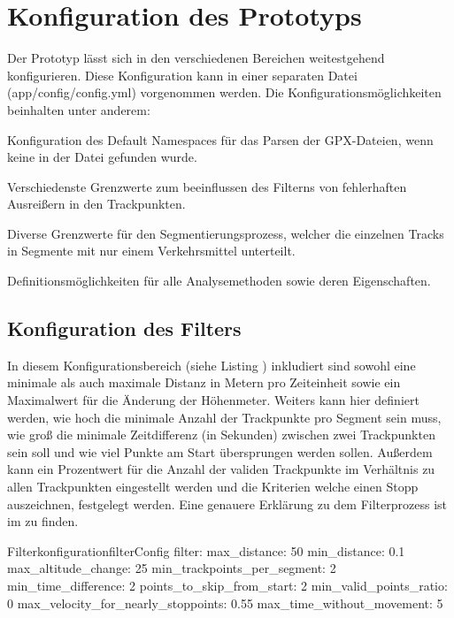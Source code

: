 
\section{Konfiguration des Prototyps}
Der Prototyp lässt sich in den verschiedenen Bereichen weitestgehend konfigurieren. Diese Konfiguration kann in einer separaten Datei (app/config/config.yml) vorgenommen werden. Die Konfigurationsmöglichkeiten beinhalten unter anderem:
\begin{pitemize}
\item Konfiguration des Default Namespaces für das Parsen der GPX-Dateien, wenn keine in der Datei gefunden wurde.
\item Verschiedenste Grenzwerte zum beeinflussen des Filterns von fehlerhaften Ausreißern in den Trackpunkten.
\item Diverse Grenzwerte für den Segmentierungsprozess, welcher die einzelnen Tracks in Segmente mit nur einem Verkehrsmittel unterteilt.
\item Definitionsmöglichkeiten für alle Analysemethoden sowie deren Eigenschaften.
\end{pitemize}

\subsection{Konfiguration des Filters}
In diesem Konfigurationsbereich (siehe Listing ) inkludiert sind sowohl eine minimale als auch maximale Distanz in Metern pro Zeiteinheit sowie ein Maximalwert für die Änderung der Höhenmeter. Weiters kann hier definiert werden, wie hoch die minimale Anzahl der Trackpunkte pro Segment sein muss, wie groß die minimale Zeitdifferenz (in Sekunden) zwischen zwei Trackpunkten sein soll und wie viel Punkte am Start übersprungen werden sollen. Außerdem kann ein Prozentwert für die Anzahl der validen Trackpunkte im Verhältnis zu allen Trackpunkten eingestellt werden und die Kriterien welche einen Stopp auszeichnen, festgelegt werden. Eine genauere Erklärung zu dem Filterprozess ist im  zu finden.

\begin{code}[]{Filterkonfiguration}{filterConfig}
  filter:
    max_distance: 50
    min_distance: 0.1
    max_altitude_change: 25
    min_trackpoints_per_segment: 2
    min_time_difference: 2
    points_to_skip_from_start: 2
    min_valid_points_ratio: 0
    max_velocity_for_nearly_stoppoints: 0.55
    max_time_without_movement: 5
\end{code}

